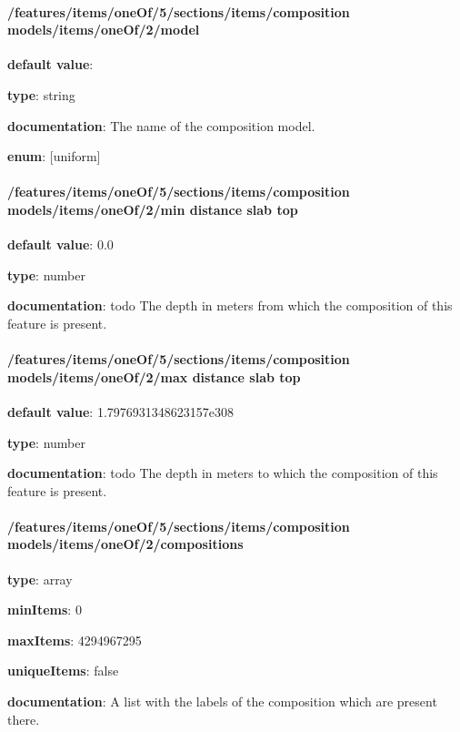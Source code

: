 \paragraph{/features/items/oneOf/5/sections/items/composition models/items/oneOf/2/model} \begin{itemized}
\item {\bf default value}: 
\item {\bf type}: string
\item {\bf documentation}: The name of the composition model.
\item {\bf enum}: [uniform]\end{itemized}\paragraph{/features/items/oneOf/5/sections/items/composition models/items/oneOf/2/min distance slab top} \begin{itemized}
\item {\bf default value}: 0.0
\item {\bf type}: number
\item {\bf documentation}: todo The depth in meters from which the composition of this feature is present.
\end{itemized}\paragraph{/features/items/oneOf/5/sections/items/composition models/items/oneOf/2/max distance slab top} \begin{itemized}
\item {\bf default value}: 1.7976931348623157e308
\item {\bf type}: number
\item {\bf documentation}: todo The depth in meters to which the composition of this feature is present.
\end{itemized}\paragraph{/features/items/oneOf/5/sections/items/composition models/items/oneOf/2/compositions} \begin{itemized}
\item {\bf type}: array
\item {\bf minItems}: 0
\item {\bf maxItems}: 4294967295
\item {\bf uniqueItems}: false
\item {\bf documentation}: A list with the labels of the composition which are present there.

\end{itemized}
